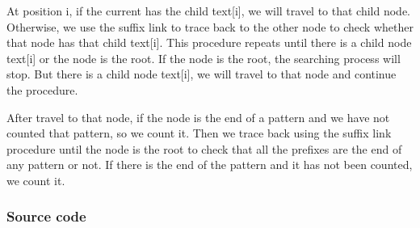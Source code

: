At position i, if the current has the child text[i], we will travel to that child node. Otherwise, we use the suffix link to trace back to the other node to check whether that node has that child text[i]. This procedure repeats until there is a child node text[i] or the node is the root. If the node is the root, the searching process will stop. But there is a child node text[i], we will travel to that node and continue the procedure. 

After travel to that node, if the node is the end of a pattern and we have not counted that pattern, so we count it. Then we trace back using the suffix link procedure until the node is the root to check that all the prefixes are the end of any pattern or not. If there is the end of the pattern and it has not been counted, we count it. 
\pagebreak
\subsubsection*{Source code}

\pagebreak

